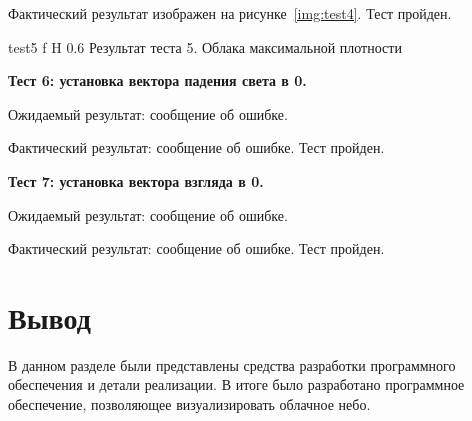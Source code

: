 Фактический результат изображен на рисунке~\ref{img:test4}. Тест пройден.

{test5} %
{f} %
{H} %
{0.6\textwidth} %
{Результат теста 5. Облака максимальной плотности} %


\textbf{Тест 6: установка вектора падения света в 0.}

Ожидаемый результат: сообщение об ошибке.

Фактический результат: сообщение об ошибке. Тест пройден.


\textbf{Тест 7: установка вектора взгляда в 0.}

Ожидаемый результат: сообщение об ошибке.

Фактический результат: сообщение об ошибке. Тест пройден.


\section*{Вывод}

В данном разделе были представлены средства разработки программного обеспечения и детали реализации. В итоге было разработано программное обеспечение, позволяющее визуализировать облачное небо.


